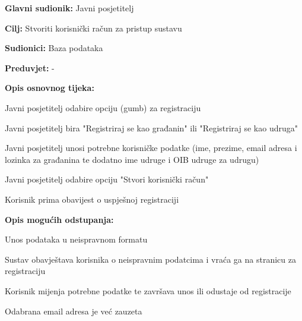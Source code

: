 	
	

	
			\noindent {}
			\begin{packed_item}
				
				\item \textbf{Glavni sudionik:} Javni posjetitelj
				\item  \textbf{Cilj:} Stvoriti korisnički račun za pristup sustavu
				\item  \textbf{Sudionici:} Baza podataka
				\item  \textbf{Preduvjet:} -
				\item  \textbf{Opis osnovnog tijeka:}
				
				\item[] \begin{packed_enum}
					
					\item Javni posjetitelj odabire opciju (gumb) za registraciju 
					\item Javni posjetitelj bira "Registriraj se kao građanin" ili "Registriraj se kao udruga"
					\item Javni posjetitelj unosi potrebne korisničke podatke (ime, prezime, email adresa i lozinka za građanina te dodatno ime udruge i OIB udruge za udrugu)
					\item Javni posjetitelj odabire opciju "Stvori korisnički račun"
					\item Korisnik prima obavijest o uspješnoj registraciji
				\end{packed_enum}
				
				\item  \textbf{Opis mogućih odstupanja:}
				
				\item[] \begin{packed_item}
					
					\item [2.a] Unos podataka u neispravnom formatu 
					\item[] \begin{packed_enum}
						
						\item Sustav obavještava korisnika o neispravnim podatcima i vraća ga na stranicu za registraciju
						\item Korisnik mijenja potrebne podatke te završava unos ili odustaje od registracije

					\end{packed_enum}
					\item [2.b] Odabrana email adresa je već zauzeta
					\item[] \begin{packed_enum}
					

\end{packed_enum}
\end{packed_item}
\end{packed_item}
